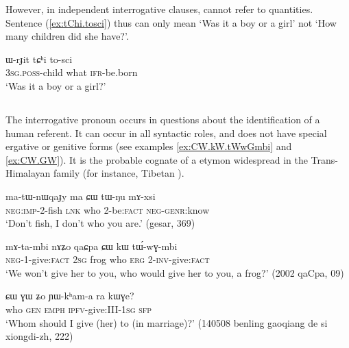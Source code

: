 However, in independent interrogative clauses,  cannot refer to quantities. Sentence (\ref{ex:tChi.tosci}) thus can only mean `Was it a boy or a girl' not `How many children did she have?'.

\begin{exe}
\ex \label{ex:tChi.tosci}
\gll  ɯ-rɟit tɕʰi to-sci \\
\textsc{3sg.poss}-child what \textsc{ifr}-be.born \\
\glt `Was it a boy or a girl?'
\end{exe}  

\subsection{}
The interrogative pronoun  occurs in questions about the identification of a human referent. It can occur in all syntactic roles, and does not have special ergative or genitive forms (see examples \ref{ex:CW.kW.tWwGmbi} and \ref{ex:CW.GW}). It is the probable cognate of a etymon widespread in the Trans-Himalayan family (for instance, Tibetan ).

\begin{exe}
\ex  \label{ex:CW.tWNu}
\gll ma-tɯ-nɯqaɟy ma ɕɯ tɯ-ŋu mɤ-xsi \\
\textsc{neg:imp}-2-fish \textsc{lnk} who 2-be:\textsc{fact} \textsc{neg-genr}:know   \\
\glt `Don't fish, I don't who you are.' (gesar, 369)
\end{exe}  

\begin{exe}
\ex  \label{ex:CW.kW.tWwGmbi}
\gll  mɤ-ta-mbi nɤʑo qaɕpa ɕɯ kɯ tɯ́-wɣ-mbi    \\
\textsc{neg}-1-give:\textsc{fact} \textsc{2sg} frog who \textsc{erg} 2-\textsc{inv}-give:\textsc{fact}  \\
\glt `We won't give her to you, who would give her to you, a frog?'   (2002 qaCpa, 09)
\end{exe} 
 
\begin{exe}
\ex  \label{ex:CW.GW}
\gll  ɕɯ ɣɯ ʑo ɲɯ-kʰam-a ra kɯɣe?    \\
who \textsc{gen} \textsc{emph} \textsc{ipfv}-give:III-\textsc{1sg} \textsc{sfp} \\
\glt `Whom should I give (her) to (in marriage)?' (140508 benling gaoqiang de si xiongdi-zh, 222)
\end{exe}  

